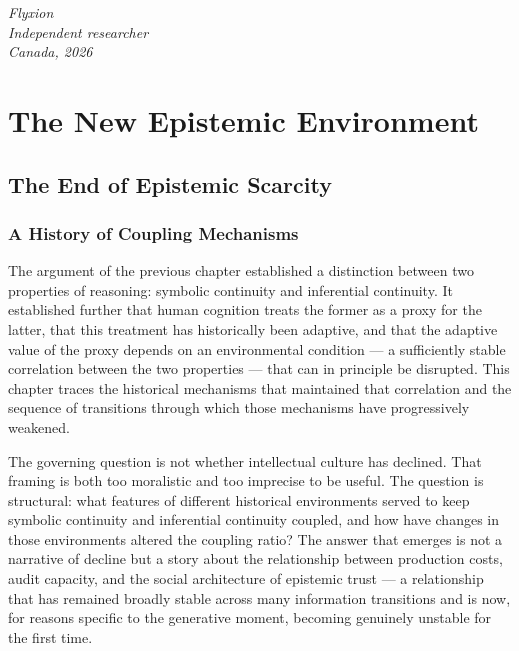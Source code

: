 \documentclass[12pt, openright, twoside]{book}
\begin{document}
\bigskip
\noindent\textit{Flyxion}\\
\noindent\textit{Independent researcher}\\
\noindent\textit{Canada, 2026}

\clearpage

\part{The New Epistemic Environment}

\chapter{The End of Epistemic Scarcity}

\section{A History of Coupling Mechanisms}

The argument of the previous chapter established a distinction between two
properties of reasoning: symbolic continuity and inferential continuity. It
established further that human cognition treats the former as a proxy for the
latter, that this treatment has historically been adaptive, and that the
adaptive value of the proxy depends on an environmental condition --- a
sufficiently stable correlation between the two properties --- that can in
principle be disrupted. This chapter traces the historical mechanisms that
maintained that correlation and the sequence of transitions through which
those mechanisms have progressively weakened.

The governing question is not whether intellectual culture has declined. That
framing is both too moralistic and too imprecise to be useful. The question is
structural: what features of different historical environments served to keep
symbolic continuity and inferential continuity coupled, and how have changes
in those environments altered the coupling ratio? The answer that emerges is
not a narrative of decline but a story about the relationship between production
costs, audit capacity, and the social architecture of epistemic trust --- a
relationship that has remained broadly stable across many information
transitions and is now, for reasons specific to the generative moment, becoming
genuinely unstable for the first time.
\end{document}
